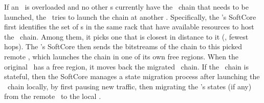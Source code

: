 If an \snic\ is overloaded and no other \snic{}s currently have the \nt\ chain that needs to be launched, the \snic\ tries to launch the chain at another \snic.
Specifically, the \snic's SoftCore first identifies the set of \snic{}s in the same rack that have available resources to host the \nt\ chain.
Among them, it picks one that is closest in distance to it (\ie, fewest hops).
The \snic's SoftCore then sends the bitstreams of the \nt{} chain to this picked remote \snic, which launches the chain in one of its own free regions.
When the original \snic\ has a free region, it moves back the migrated \nt\ chain. 
If the \nt\ chain is stateful, then the SoftCore manages a state migration process after launching the \nt\ chain locally, by first pausing new traffic, then migrating the \nt's states (if any) from the remote \snic\ to the local \snic. %